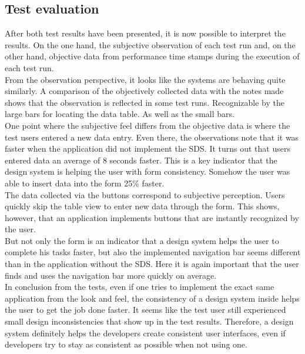 \subsection{Test evaluation}
After both test results have been presented, it is now possible to interpret the results. On the one hand, the subjective observation of each test run and, on the other hand, objective data from performance time stamps during the execution of each test run. \\
From the observation perspective, it looks like the systems are behaving quite similarly. A comparison of the objectively collected data with the notes made shows that the observation is reflected in some test runs. Recognizable by the large bars for locating the data table. As well as the small bars. \\
One point where the subjective feel differs from the objective data is where the test users entered a new data entry. Even there, the observations note that it was faster when the application did not implement the SDS. It turns out that users entered data an average of 8 seconds faster. This is a key indicator that the design system is helping the user with form consistency. Somehow the user was able to insert data into the form 25\% faster. \\
The data collected via the buttons correspond to subjective perception. Users quickly skip the table view to enter new data through the form. This shows, however, that an application implements buttons that are instantly recognized by the user. \\
But not only the form is an indicator that a design system helps the user to complete his tasks faster, but also the implemented navigation bar seems different than in the application without the \ac{SDS}. Here it is again important that the user finds and uses the navigation bar more quickly on average. \\

In conclusion from the tests, even if one tries to implement the exact same application from the look and feel, the consistency of a design system inside helps the user to get the job done faster. It seems like the test user still experienced small design inconsistencies that show up in the test results. Therefore, a design system definitely helps the developers create consistent user interfaces, even if developers try to stay as consistent as possible when not using one.
